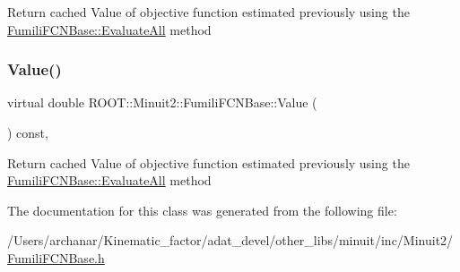 Return cached Value of objective function estimated previously using the \mbox{\hyperlink{classROOT_1_1Minuit2_1_1FumiliFCNBase_a0741bb4a7405cc33ab60583472a189cb}{Fumili\+F\+C\+N\+Base\+::\+Evaluate\+All}} method \mbox{\label{classROOT_1_1Minuit2_1_1FumiliFCNBase_a221dacee0ccde747a271a0cecd759f98}} 
\subsubsection{\texorpdfstring{Value()}{Value()}\hspace{0.1cm}{\footnotesize\ttfamily [2/2]}}
{\footnotesize\ttfamily virtual double R\+O\+O\+T\+::\+Minuit2\+::\+Fumili\+F\+C\+N\+Base\+::\+Value (\begin{DoxyParamCaption}{ }\end{DoxyParamCaption}) const\hspace{0.3cm}{\ttfamily [inline]}, {\ttfamily [virtual]}}

Return cached Value of objective function estimated previously using the \mbox{\hyperlink{classROOT_1_1Minuit2_1_1FumiliFCNBase_a0741bb4a7405cc33ab60583472a189cb}{Fumili\+F\+C\+N\+Base\+::\+Evaluate\+All}} method 

The documentation for this class was generated from the following file\+:\begin{DoxyCompactItemize}
\item 
/\+Users/archanar/\+Kinematic\+\_\+factor/adat\+\_\+devel/other\+\_\+libs/minuit/inc/\+Minuit2/\mbox{\hyperlink{other__libs_2minuit_2inc_2Minuit2_2FumiliFCNBase_8h}{Fumili\+F\+C\+N\+Base.\+h}}\end{DoxyCompactItemize}
